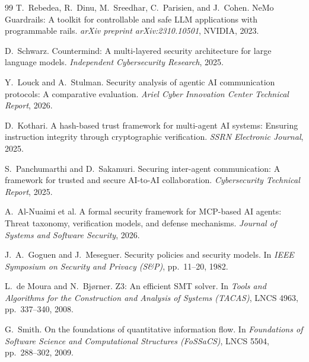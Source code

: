 \begin{thebibliography}{99}
T.~Rebedea, R.~Dinu, M.~Sreedhar, C.~Parisien, and J.~Cohen.
\newblock NeMo Guardrails: A toolkit for controllable and safe LLM applications with programmable rails.
\newblock \emph{arXiv preprint arXiv:2310.10501}, NVIDIA, 2023.

D.~Schwarz.
\newblock Countermind: A multi-layered security architecture for large language models.
\newblock \emph{Independent Cybersecurity Research}, 2025.

Y.~Louck and A.~Stulman.
\newblock Security analysis of agentic AI communication protocols: A comparative evaluation.
\newblock \emph{Ariel Cyber Innovation Center Technical Report}, 2026.

D.~Kothari.
\newblock A hash-based trust framework for multi-agent AI systems: Ensuring instruction integrity through cryptographic verification.
\newblock \emph{SSRN Electronic Journal}, 2025.

S.~Panchumarthi and D.~Sakamuri.
\newblock Securing inter-agent communication: A framework for trusted and secure AI-to-AI collaboration.
\newblock \emph{Cybersecurity Technical Report}, 2025.

A.~Al-Nuaimi et al.
\newblock A formal security framework for MCP-based AI agents: Threat taxonomy, verification models, and defense mechanisms.
\newblock \emph{Journal of Systems and Software Security}, 2026.


J.~A.~Goguen and J.~Meseguer.
\newblock Security policies and security models.
\newblock In \emph{IEEE Symposium on Security and Privacy (S\&P)}, pp.~11--20, 1982.

L.~de Moura and N.~Bj{\o}rner.
\newblock Z3: An efficient SMT solver.
\newblock In \emph{Tools and Algorithms for the Construction and Analysis of Systems (TACAS)}, LNCS 4963, pp.~337--340, 2008.

G.~Smith.
\newblock On the foundations of quantitative information flow.
\newblock In \emph{Foundations of Software Science and Computational Structures (FoSSaCS)}, LNCS 5504, pp.~288--302, 2009.



\end{thebibliography}
